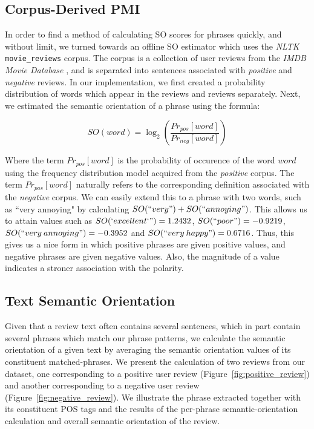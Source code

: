 \documentclass[11pt]{report} %
\begin{document}
\subsection{Corpus-Derived PMI}
In order to find a method of calculating SO scores for phrases quickly, and without limit, we turned towards an offline SO estimator which uses the \textit{NLTK} \verb|movie_reviews| corpus. The corpus is a collection of user reviews from the \textit{IMDB Movie Database} , and is separated into sentences associated with \textit{positive} and \textit{negative} reviews. In our implementation, we first created a probability distribution of words which appear in the  reviews and  reviews separately. Next, we estimated the semantic orientation of a phrase using the formula:

\begin{equation*} SO(word) = \log_2 \left(\frac{Pr_{pos}[word]}{Pr_{neg}[word]}\right) \end{equation*}

Where the term $Pr_{pos}[word]$ is the probability of occurence of the word $word$ using the frequency distribution model acquired from the \textit{positive} corpus. The term $Pr_{pos}[word]$ naturally refers to the corresponding definition associated with the \textit{negative} corpus. We can easily extend this to a phrase with two words, such as ``very annoying" by calculating $SO(``very") + SO(``annoying")$. This allows us to attain values such as $SO(`excellent`")=1.2432$, $SO(``poor")=-0.9219$, $SO(``very \: annoying")=-0.3952$ and $SO(``very \: happy")=0.6716$. Thus, this gives us a nice form in which positive phrases are given positive values, and negative phrases are given negative values. Also, the magnitude of a value indicates a stroner association with the polarity.

\subsection{Text Semantic Orientation}
Given that a review text often contains several sentences, which in part contain several phrases which match our phrase patterns, we calculate the semantic orientation of a given text by averaging the semantic orientation values of its constituent matched-phrases. We present the calculation of two reviews from our dataset, one corresponding to a positive user review (Figure~\ref{fig:positive_review}) and another corresponding to a negative user review (Figure~\ref{fig:negative_review}). We illustrate the phrase extracted together with its constituent POS tags and the results of the per-phrase semantic-orientation calculation and overall semantic orientation of the review.
\end{document}
